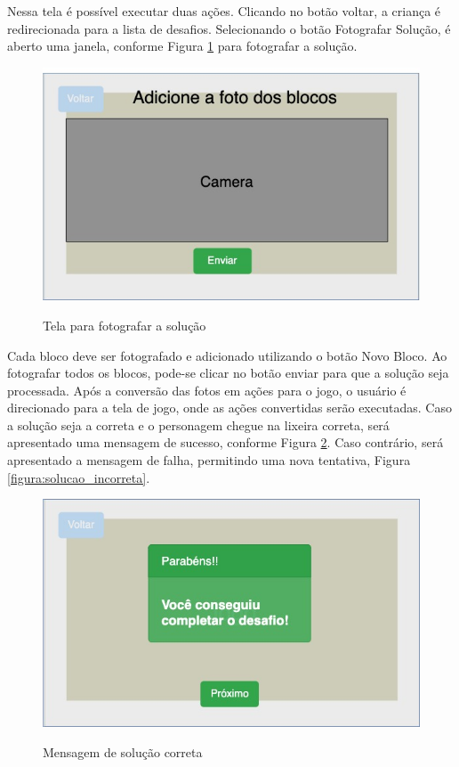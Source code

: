     Nessa tela é possível executar duas ações.
    Clicando no botão voltar, a criança é redirecionada para a lista de desafios.
    Selecionando o botão Fotografar Solução, é aberto uma janela, conforme Figura \ref{figura:fotografar_blocos} para fotografar a solução.
    
    \begin{figure}[H]
        \caption{Tela para fotografar a solução}
        \centering
        \includegraphics[width=\linewidth]{Imagens/cap3/UploadSolucao.jpg}
        \label{figura:fotografar_blocos}
    \end{figure}
    
    Cada bloco deve ser fotografado e adicionado utilizando o botão Novo Bloco.
    Ao fotografar todos os blocos, pode-se clicar no botão enviar para que a solução seja processada.
    Após a conversão das fotos em ações para o jogo, o usuário é direcionado para a tela de jogo, onde as ações convertidas serão executadas.
    Caso a solução seja a correta e o personagem chegue na lixeira correta, será apresentado uma mensagem de sucesso, conforme Figura \ref{figura:solucao_correta}. Caso contrário, será apresentado a mensagem de falha, permitindo uma nova tentativa, Figura \ref{figura:solucao_incorreta}.
    
    \begin{figure}[H]
        \caption{Mensagem de solução correta}
        \centering
        \includegraphics[width=\linewidth]{Imagens/cap3/solucao_correta.jpg}
        \label{figura:solucao_correta}
    \end{figure}
    

